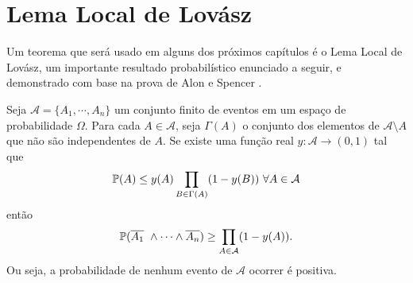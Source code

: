 \section{Lema Local de Lovász}

Um teorema que será usado em alguns dos próximos capítulos é o Lema Local de Lovász, um importante resultado probabilístico enunciado a seguir, e demonstrado com base na prova de Alon e Spencer \cite{alon2004probabilistic}.

\begin{teorema}\label{LLL}
Seja $\mathcal{A} = \{A_1, \cdots, A_n\}$ um conjunto finito de eventos em um espaço de probabilidade $\Omega$. Para cada $A\in \mathcal{A}$, seja $\Gamma(A)$ o conjunto dos elementos de $\mathcal{A}\setminus A$ que não são independentes de $A$. Se existe uma função real $y : \mathcal{A} \rightarrow (0,1)$ tal que
\[\mathbb{P}(A)\leq y(A) \prod_{B\in \Gamma(A)}(1-y(B))\ \forall A\in \mathcal{A}\]
então 
\[\mathbb{P}(\overline{A_1}\ \wedge \cdots \wedge \overline{A_n}) \geq \prod_{A\in\mathcal{A}}(1-y(A)).\]
Ou seja, a probabilidade de nenhum evento de $\mathcal{A}$ ocorrer é positiva.
\end{teorema}

